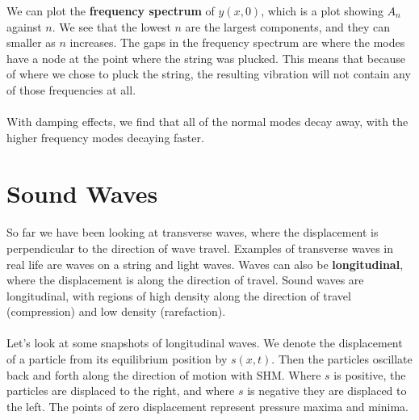 \documentclass[../classical_mechanics.tex]{subfiles}
\begin{document}
        We can plot the \textbf{frequency spectrum} of $y(x,0)$, which is a plot showing $A_n$ against $n$.
        We see that the lowest $n$ are the largest components, and they can smaller as $n$ increases.
        The gaps in the frequency spectrum are where the modes have a node at the point where the string was plucked.
        This means that because of where we chose to pluck the string, the resulting vibration will not contain any of those frequencies at all.

        \paragraph{}
        With damping effects, we find that all of the normal modes decay away, with the higher frequency modes decaying faster.

    \section{Sound Waves}\label{sec:sound-waves}
        \paragraph{}
        So far we have been looking at transverse waves, where the displacement is perpendicular to the direction of wave travel.
        Examples of transverse waves in real life are waves on a string and light waves.
        Waves can also be \textbf{longitudinal}, where the displacement is along the direction of travel.
        Sound waves are longitudinal, with regions of high density along the direction of travel (compression) and low density (rarefaction).
        
        \paragraph{}
        Let's look at some snapshots of longitudinal waves.
        We denote the displacement of a particle from its equilibrium position by $s(x,t)$.
        Then the particles oscillate back and forth along the direction of motion with SHM.
        Where $s$ is positive, the particles are displaced to the right, and where $s$ is negative they are displaced to the left.
        The points of zero displacement represent pressure maxima and minima.
\end{document}
